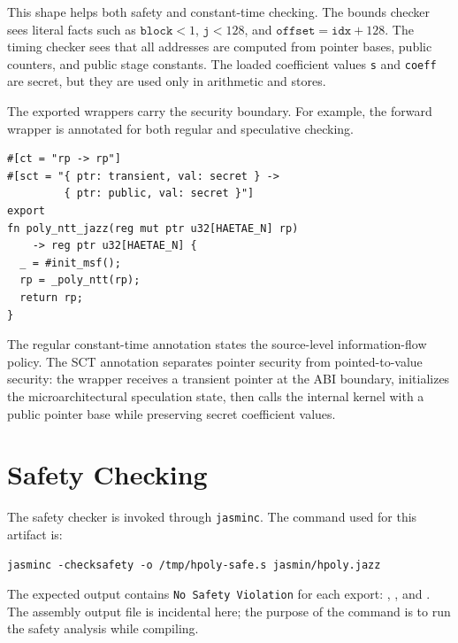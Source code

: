 \documentclass[10pt,twocolumn]{article}
\newcommand{\ct}{constant-time}
\begin{document}
This shape helps both safety and \ct{} checking.  The bounds checker sees
literal facts such as \(\texttt{block}<1\), \(\texttt{j}<128\), and
\(\texttt{offset}=\texttt{idx}+128\).  The timing checker sees that all
addresses are computed from pointer bases, public counters, and public stage
constants.  The loaded coefficient values \texttt{s} and \texttt{coeff} are
secret, but they are used only in arithmetic and stores.

The exported wrappers carry the security boundary.  For example, the forward
wrapper is annotated for both regular and speculative checking.

\begin{lstlisting}[language=Jasmin,caption={Exported wrapper annotation.},label={lst:wrapper}]
#[ct = "rp -> rp"]
#[sct = "{ ptr: transient, val: secret } ->
         { ptr: public, val: secret }"]
export
fn poly_ntt_jazz(reg mut ptr u32[HAETAE_N] rp)
    -> reg ptr u32[HAETAE_N] {
  _ = #init_msf();
  rp = _poly_ntt(rp);
  return rp;
}
\end{lstlisting}

The regular \ct{} annotation states the source-level information-flow policy.
The SCT annotation separates pointer security from pointed-to-value security:
the wrapper receives a transient pointer at the ABI boundary, initializes the
microarchitectural speculation state, then calls the internal kernel with a
public pointer base while preserving secret coefficient values.

\section{Safety Checking}

The safety checker is invoked through \texttt{jasminc}.  The command used for
this artifact is:

\begin{lstlisting}[language=Shell,caption={Safety checker command.},label={lst:safetycmd}]
jasminc -checksafety -o /tmp/hpoly-safe.s jasmin/hpoly.jazz
\end{lstlisting}

The expected output contains \texttt{No Safety Violation} for each export:
, , and
.  The assembly output file is incidental here; the
purpose of the command is to run the safety analysis while compiling.
\end{document}

